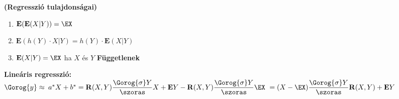	\textbf{ (Regresszió tulajdonságai) } %
\begin{enumerate}
	\item $\mathbf{E}( \mathbf{E} ( X|Y ) ) = \EX$
	\item $\mathbf{E}( h(Y) \cdot X|Y ) = h(Y) \cdot \mathbf{E}(X | Y ) $
	\item $\mathbf{E} (X | Y) = \EX$ ha $X$ és $Y$ \textbf{Függetlenek}
\end{enumerate}

	\textbf{Lineáris regresszió: }\\[2pt]
	\forceindent $\Gorog{y} \approx $ $a^*X+b^* = \mathbf{R}( X,Y)\dfrac{\Gorog{\sigma} Y}{\szoras} X + \mathbf{E}Y - \mathbf{R}(X,Y) \dfrac{\Gorog{\sigma} Y}{\szoras} \EX \ = (X - \EX) \dfrac{\Gorog{\sigma} Y}{\szoras} \mathbf{R}(X,Y) + \mathbf{E}Y$
